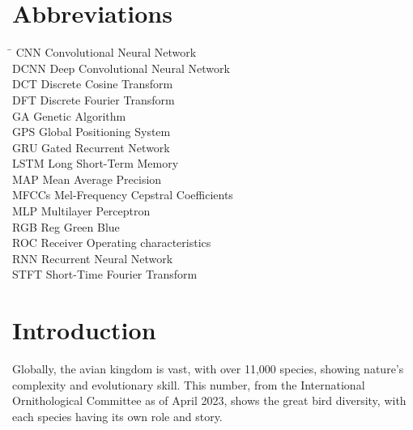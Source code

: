 

\chapter*{Abbreviations}
\begin{tabbing}
    \hspace{50mm}\=\kill
    CNN \> Convolutional Neural Network\\
    DCNN \> Deep Convolutional Neural Network\\
    DCT \> Discrete Cosine Transform\\
    DFT \> Discrete Fourier Transform\\
    GA \> Genetic Algorithm\\
    GPS \> Global Positioning System\\
    GRU \> Gated Recurrent Network\\
    LSTM \> Long Short-Term Memory\\
    MAP \> Mean Average Precision\\
    MFCCs \> Mel-Frequency Cepstral Coefficients\\
    MLP \> Multilayer Perceptron\\
    RGB \> Reg Green Blue\\
    ROC \> Receiver Operating characteristics\\
    RNN \> Recurrent Neural Network\\
    STFT \> Short-Time Fourier Transform\\
\end{tabbing}
\newpage
{}

\chapter{Introduction}\label{sec}
Globally, the avian kingdom is vast, with over 11,000 species, showing nature's
complexity and evolutionary skill. This number, from the International Ornithological
Committee as of April 2023, shows the great bird diversity, with each species having 
its own role and story.\cite{ioc_updates}

